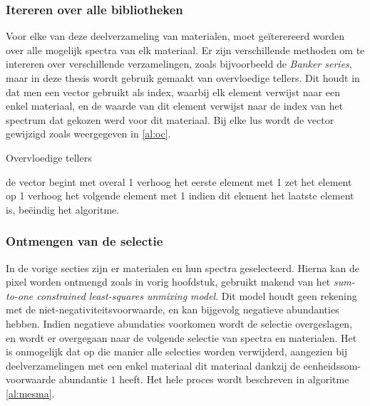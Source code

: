 \documentclass[12pt]{report}
\begin{document}
\subsubsection{Itereren over alle bibliotheken}

Voor elke van deze deelverzameling van materialen, moet ge\"iterereerd worden over alle mogelijk spectra van elk materiaal. Er zijn verschillende methoden om te intereren over verschillende verzamelingen, zoals bijvoorbeeld de \textit{Banker series}, maar in deze thesis wordt gebruik gemaakt van overvloedige tellers\citep{mesma}. Dit houdt in dat men een vector gebruikt als index, waarbij elk element verwijst naar een enkel materiaal, en de waarde van dit element verwijst naar de index van het spectrum dat gekozen werd voor dit materiaal. Bij elke lus wordt de vector gewijzigd zoals weergegeven in \ref{al:oc}.

\begin{algorithm}
\caption{Overvloedige tellers\label{al:oc}}
\begin{algorithmic}[1]
\State de vector begint met overal 1
\State verhoog het eerste element met 1
\State zet het element op 1
\State verhoog het volgende element met 1
\State indien dit element het laatste element is, be\"eindig het algoritme.
\EndIf
\EndFor
\EndWhile
\end{algorithmic}
\end{algorithm}


\subsubsection{Ontmengen van de selectie}

In de vorige secties zijn er materialen en hun spectra geselecteerd. Hierna kan de pixel worden ontmengd zoals in vorig hoofdstuk, gebruikt makend van het \textit{sum-to-one constrained least-squares unmixing model}. Dit model houdt geen rekening met de niet-negativiteitsvoorwaarde, en kan bijgevolg negatieve abundanties hebben. Indien negatieve abundaties voorkomen wordt de selectie overgeslagen, en wordt er overgegaan naar de volgende selectie van spectra en materialen. Het is onmogelijk dat op die manier alle selecties worden verwijderd, aangezien bij deelverzamelingen met een enkel materiaal dit materiaal dankzij de eenheidssom-voorwaarde abundantie $1$ heeft. Het hele proces wordt beschreven in algoritme \ref{al:mesma}.
\end{document}
